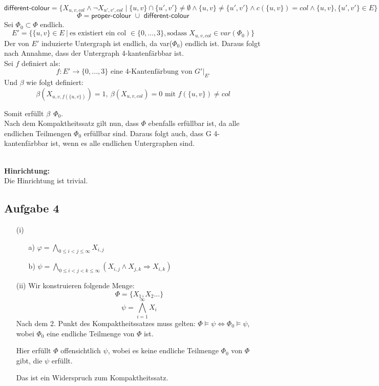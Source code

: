 \documentclass[a4paper,10pt]{article}
\begin{document}
	\[\textsf{different-colour} = 
	 \{ X_{u,v,col} \wedge \neg X_{u',v',col}\mid
	\{ u,v \} \cap \{ u',v' \} \neq \emptyset \wedge 
	\{ u,v \} \neq \{ u',v' \} \wedge 
	c(\{ u,v \}) = col \wedge 
	\{u,v\},\{u',v'\} \in E \} \] 
	\[\Phi = \textsf{proper-colour } \cup \textsf{ different-colour} \]
	Sei $\Phi_0 \subset \Phi$ endlich. 
	\[E' = \{ \{u,v\} \in E~|~\text{es existiert ein col } \in \{0,...,3\}, \text{sodass } X_{u,v,col} \in var(\Phi_0) \}\] 
	Der von $E'$ induzierte Untergraph ist endlich, da var($\Phi_0$) endlich ist. Daraus folgt nach Annahme, dass der Untergraph 4-kantenfärbbar ist.\\
	Sei $f$ definiert als:
	\[f: E' \rightarrow \{0,...,3\} \text{ eine 4-Kantenfärbung von } G' |_{E'}\]
	Und $\beta$ wie folgt definiert: \\
	\[\beta(X_{u,v,f(\{ u,v \})}) = 1,~\beta(X_{u,v,col}) = 0 \text{ mit } f(\{ u,v \}) \neq col \] 

	Somit erfüllt $\beta~~\Phi_0$.\\
	Nach dem Kompaktheitssatz gilt nun, dass $\Phi$ ebenfalls erfüllbar ist, da alle endlichen Teilmengen $\Phi_0$ erfüllbar sind. Daraus folgt auch, dass G 4-kantenfärbbar ist, wenn es alle endlichen Untergraphen sind.
	
	\ \\ \textbf{Hinrichtung:} \\
	Die Hinrichtung ist trivial.
	
	\subsection*{Aufgabe 4}
	\begin{enumerate}
	\item[(i)]
		\begin{enumerate}
		\item[a)]
		\(\varphi = \bigwedge\limits_{0 \leq i < j \leq \infty} X_{i,j} \)
						
		\item[b)]
		\( \psi = \bigwedge\limits_{0 \leq i < j < k \leq \infty}(X_{i,j} \wedge X_{j,k} \Rightarrow X_{i,k}) \)
		
		\end{enumerate}
	\item[(ii)]
	Wir konstruieren folgende Menge: 
	$$ \Phi = \{X_1,X_2...\}$$
	$$\psi = \bigwedge_{i=1}^{\infty} X_i $$
	Nach dem 2. Punkt des Kompaktheitssatzes muss gelten: $\Phi \models \psi \Leftrightarrow \Phi_0 \models \psi$, wobei $\Phi_0$ eine endliche Teilmenge von $\Phi$ ist.

	Hier erfüllt $\Phi$ offensichtlich $\psi$, wobei es keine endliche Teilmenge $\Phi_0$ von $\Phi$ gibt, die $\psi$ erfüllt. 

	Das ist ein Widerspruch zum Kompaktheitssatz.
 
	\end{enumerate}
\end{document}
